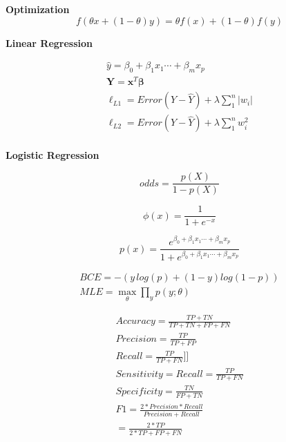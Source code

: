 \documentclass[11pt]{article}
\begin{document}
\begin{minipage}[t]{0.33\textwidth}



\textbf{Optimization}
\begin{equation*}
	f(\theta x + (1-\theta)y) = \theta f(x) + (1-\theta)f(y)
\end{equation*}

\textbf{Linear Regression}

\begin{equation*}
\begin{split}
	\hat{y} = \beta_0 + \beta_1 x_1 \cdots + \beta_m x_p \\
	\boldsymbol{Y} = \boldsymbol{x}^T \boldsymbol{\beta} \\
   \ell_{L1} = Error(Y - \widehat{Y}) + \lambda \sum_1^n |w_i|\\
   \ell_{L2} = Error(Y - \widehat{Y}) +  \lambda \sum_1^n w_i^{2}\\
\end{split}		
\end{equation*}

\textbf{Logistic Regression}

\begin{equation*}
odds = \frac{p(X)}{1-p(X)}
\end{equation*}


\begin{equation*}
	\phi(x) = \frac{1}{1+e^{-x}}
\end{equation*}


\begin{equation*}
	p(x) = \frac{e^{\beta_0 + \beta_1 x_1 \cdots + \beta_m x_p}}{1+e^{\beta_0 + \beta_1 x_1 \cdots + \beta_m x_p}}
\end{equation*}

\begin{equation*}
\begin{split}
BCE = -(y\,log(p)+(1-y)log(1-p))\\
MLE = \max_{\theta} \prod_y p(y;\theta)
\end{split}
\end{equation*}


\begin{equation*}
\begin{split}
Accuracy = \frac{TP+TN}{TP+TN+FP+FN}\\
Precision = \frac{TP}{TP+FP}\\
Recall = \frac{TP}{TP+FN}]]\\
Sensitivity = Recall = \frac{TP}{TP+FN}\\
Specificity = \frac{TN}{FP+TN}\\
F1 = \frac{2*Precision*Recall}{Precision+Recall} \\= \frac{2*TP}{2*TP+FP+FN}
\end{split}
\end{equation*}

\end{minipage}%
\end{document}
